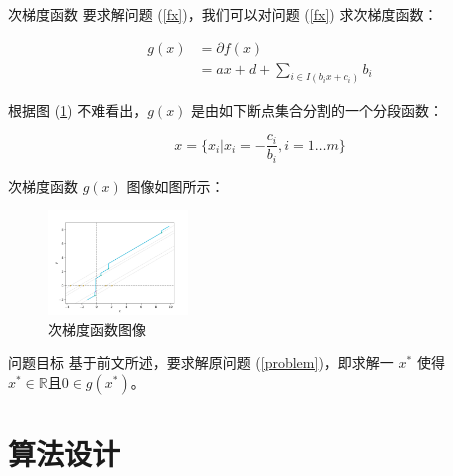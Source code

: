 \documentclass[aspectratio=169]{beamer}
\begin{document}
\begin{frame}{次梯度函数}
    要求解问题 (\ref{fx})，我们可以对问题 (\ref{fx}) 求次梯度函数：

    \begin{align}
        g(x)
         & =\partial f(x)\nonumber                    \\
         & =ax+d+\sum_{i\in I(b_ix+c_i)}b_i\label{gx}
    \end{align}

    根据图 (\ref{SubGradient}) 不难看出，$g(x)$ 是由如下断点集合分割的一个分段函数：

    \begin{equation}
        x=\{x_i|x_i=-\frac{c_i}{b_i},i=1\dots m\}\nonumber
    \end{equation}

    \framebreak

    次梯度函数 $g(x)$ 图像如图所示：

    \begin{figure}[htb]
        \centering
        \includegraphics[width=0.33\textwidth]{images/SubGradient.png}
        \caption{次梯度函数图像}
        \label{SubGradient}
    \end{figure}
\end{frame}

\begin{frame}[fragile]{问题目标}
    基于前文所述，要求解原问题 (\ref{problem})，即求解一 $x^*$ 使得 $x^*\in \mathbb{R}\text{且}0\in g(x^*)$。
\end{frame}

\section{算法设计}
\end{document}
